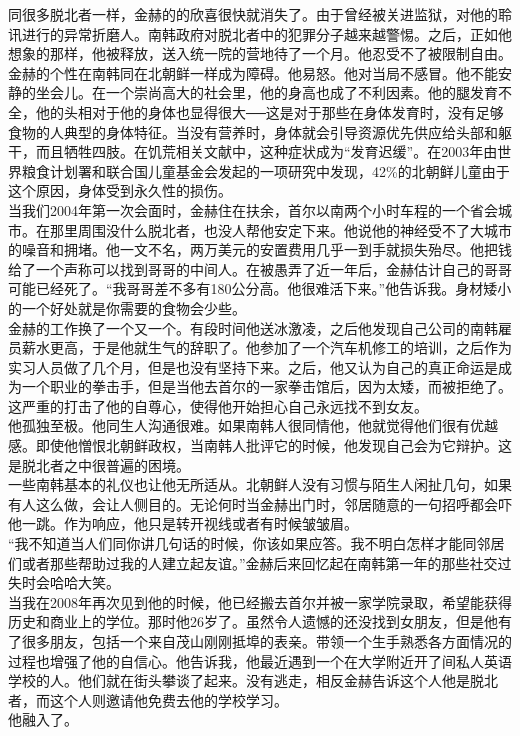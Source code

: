 同很多脱北者一样，金赫的的欣喜很快就消失了。由于曾经被关进监狱，对他的聆讯进行的异常折磨人。南韩政府对脱北者中的犯罪分子越来越警惕。之后，正如他想象的那样，他被释放，送入统一院的营地待了一个月。他忍受不了被限制自由。\\

金赫的个性在南韩同在北朝鲜一样成为障碍。他易怒。他对当局不感冒。他不能安静的坐会儿。在一个崇尚高大的社会里，他的身高也成了不利因素。他的腿发育不全，他的头相对于他的身体也显得很大──这是对于那些在身体发育时，没有足够食物的人典型的身体特征。当没有营养时，身体就会引导资源优先供应给头部和躯干，而且牺牲四肢。在饥荒相关文献中，这种症状成为“发育迟缓”。在2003年由世界粮食计划署和联合国儿童基金会发起的一项研究中发现，42\%的北朝鲜儿童由于这个原因，身体受到永久性的损伤。\\

当我们2004年第一次会面时，金赫住在扶余，首尔以南两个小时车程的一个省会城市。在那里周围没什么脱北者，也没人帮他安定下来。他说他的神经受不了大城市的噪音和拥堵。他一文不名，两万美元的安置费用几乎一到手就损失殆尽。他把钱给了一个声称可以找到哥哥的中间人。在被愚弄了近一年后，金赫估计自己的哥哥可能已经死了。“我哥哥差不多有180公分高。他很难活下来。”他告诉我。身材矮小的一个好处就是你需要的食物会少些。\\

金赫的工作换了一个又一个。有段时间他送冰激凌，之后他发现自己公司的南韩雇员薪水更高，于是他就生气的辞职了。他参加了一个汽车机修工的培训，之后作为实习人员做了几个月，但是也没有坚持下来。之后，他又认为自己的真正命运是成为一个职业的拳击手，但是当他去首尔的一家拳击馆后，因为太矮，而被拒绝了。这严重的打击了他的自尊心，使得他开始担心自己永远找不到女友。\\

他孤独至极。他同生人沟通很难。如果南韩人很同情他，他就觉得他们很有优越感。即使他憎恨北朝鲜政权，当南韩人批评它的时候，他发现自己会为它辩护。这是脱北者之中很普遍的困境。\\

一些南韩基本的礼仪也让他无所适从。北朝鲜人没有习惯与陌生人闲扯几句，如果有人这么做，会让人侧目的。无论何时当金赫出门时，邻居随意的一句招呼都会吓他一跳。作为响应，他只是转开视线或者有时候皱皱眉。\\

“我不知道当人们同你讲几句话的时候，你该如果应答。我不明白怎样才能同邻居们或者那些帮助过我的人建立起友谊。”金赫后来回忆起在南韩第一年的那些社交过失时会哈哈大笑。\\

当我在2008年再次见到他的时候，他已经搬去首尔并被一家学院录取，希望能获得历史和商业上的学位。那时他26岁了。虽然令人遗憾的还没找到女朋友，但是他有了很多朋友，包括一个来自茂山刚刚抵埠的表亲。带领一个生手熟悉各方面情况的过程也增强了他的自信心。他告诉我，他最近遇到一个在大学附近开了间私人英语学校的人。他们就在街头攀谈了起来。没有逃走，相反金赫告诉这个人他是脱北者，而这个人则邀请他免费去他的学校学习。\\

他融入了。\\
